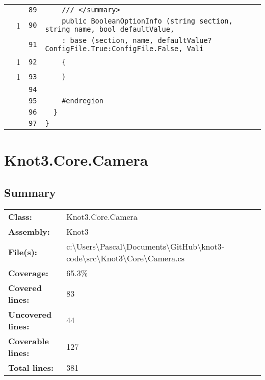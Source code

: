 \documentclass[a4paper,10pt]{article}
\begin{document}
\begin{longtable}[l]{lrrl}
\cellcolor{gray} &  & \verb~89~ & \verb~    /// </summary>~\\
\cellcolor{green} & 1 & \verb~90~ & \verb~    public BooleanOptionInfo (string section, string name, bool defaultValue, ~\\
\cellcolor{gray} &  & \verb~91~ & \verb~    : base (section, name, defaultValue?ConfigFile.True:ConfigFile.False, Vali~\\
\cellcolor{green} & 1 & \verb~92~ & \verb~    {~\\
\cellcolor{green} & 1 & \verb~93~ & \verb~    }~\\
\cellcolor{gray} &  & \verb~94~ & \verb~~\\
\cellcolor{gray} &  & \verb~95~ & \verb~    #endregion~\\
\cellcolor{gray} &  & \verb~96~ & \verb~  }~\\
\cellcolor{gray} &  & \verb~97~ & \verb~}~\\
\end{longtable}
\newpage
\section{Knot3.Core.Camera}
\subsection{Summary}
\begin{longtable}[l]{ll}
\textbf{Class:} & Knot3.Core.Camera\\
\textbf{Assembly:} & Knot3\\
\textbf{File(s):} & \begin{minipage}[t]{12cm}{c:\textbackslash Users\textbackslash Pascal\textbackslash Documents\textbackslash GitHub\textbackslash knot3-code\textbackslash src\textbackslash Knot3\textbackslash Core\textbackslash Camera.cs}\end{minipage} \\
\textbf{Coverage:} & 65.3\%\\
\textbf{Covered lines:} & 83\\
\textbf{Uncovered lines:} & 44\\
\textbf{Coverable lines:} & 127\\
\textbf{Total lines:} & 381\\
\end{longtable}
\end{document}
